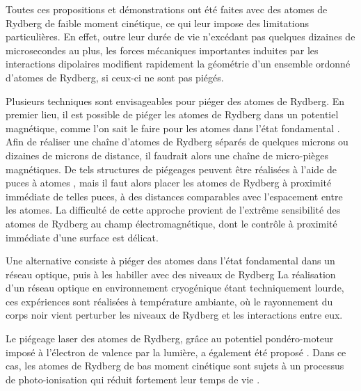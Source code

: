 Toutes ces propositions et démonstrations ont été faites avec des atomes de Rydberg de faible moment cinétique, ce qui leur impose des limitations particulières.
En effet, outre leur durée de vie n'excédant pas quelques dizaines de microsecondes au plus, les forces mécaniques importantes induites par les interactions dipolaires modifient rapidement la géométrie d'un ensemble ordonné d'atomes de Rydberg, si ceux-ci ne sont pas piégés.

Plusieurs techniques sont envisageables pour piéger des atomes de Rydberg.
En premier lieu, il est possible de piéger les atomes de Rydberg dans un potentiel magnétique, comme l'on sait le faire pour les atomes dans l'état fondamental \cite{MX_RAITHELTRAPPERDYD05}.
Afin de réaliser une chaîne d'atomes de Rydberg séparés de quelques microns ou dizaines de microns de distance, il faudrait alors une chaîne de micro-pièges magnétiques.
De tels structures de piégeages peuvent être réalisées à l'aide de puces à atomes \cite{muller2010trapping}, mais il faut alors placer les atomes de Rydberg à proximité immédiate de telles puces, à des distances comparables avec l'espacement entre les atomes.
La difficulté de cette approche provient de l'extrême sensibilité des atomes de Rydberg au champ électromagnétique, dont le contrôle à proximité immédiate d'une surface est délicat.

Une alternative consiste à piéger des atomes dans l'état fondamental dans un réseau optique, puis à les habiller avec des niveaux de Rydberg \cite{Johnson2010,Zeiher2016,Bijnen2015,Glaetzle2015,Macri2014}
La réalisation d'un réseau optique en environnement cryogénique étant techniquement lourde, ces expériences sont réalisées à température ambiante, où le rayonnement du corps noir vient perturber les niveaux de Rydberg et les interactions entre eux.

Le piégeage laser des atomes de Rydberg, grâce au potentiel pondéro-moteur imposé à l'électron de valence par la lumière, a également été proposé \cite{MX_RAITHELTRAP00}.
Dans ce cas, les atomes de Rydberg de bas moment cinétique sont sujets à un processus de photo-ionisation qui réduit fortement leur temps de vie \cite{MX_RAITHELPHOTION13}.

